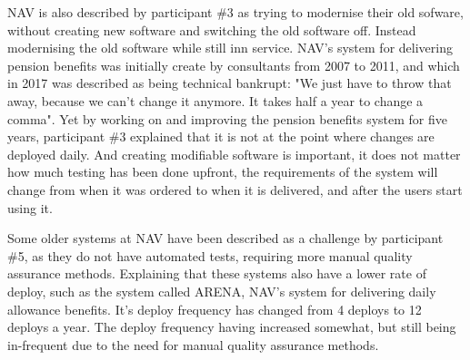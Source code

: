 
NAV is also described by participant \#3 as trying to modernise their old sofware, without creating new software and switching the old software off. Instead modernising the old software while still inn service. NAV's system for delivering pension benefits was initially create by consultants from 2007 to 2011, and which in 2017 was described as being technical bankrupt: "We just have to throw that away, because we can't change it anymore. It takes half a year to change a comma". Yet by working on and improving the pension benefits system for five years, participant \#3 explained that it is not at the point where changes are deployed daily. And creating modifiable software is important, it does not matter how much testing has been done upfront, the requirements of the system will change from when it was ordered to when it is delivered, and after the users start using it.


Some older systems at NAV have been described as a challenge by participant \#5, as they do not have automated tests, requiring more manual quality assurance methods. Explaining that these systems also have a lower rate of deploy, such as the system called ARENA, NAV's system for delivering daily allowance benefits. It's deploy frequency has changed from 4 deploys to 12 deploys a year. The deploy frequency having increased somewhat, but still being in-frequent due to the need for manual quality assurance methods.

